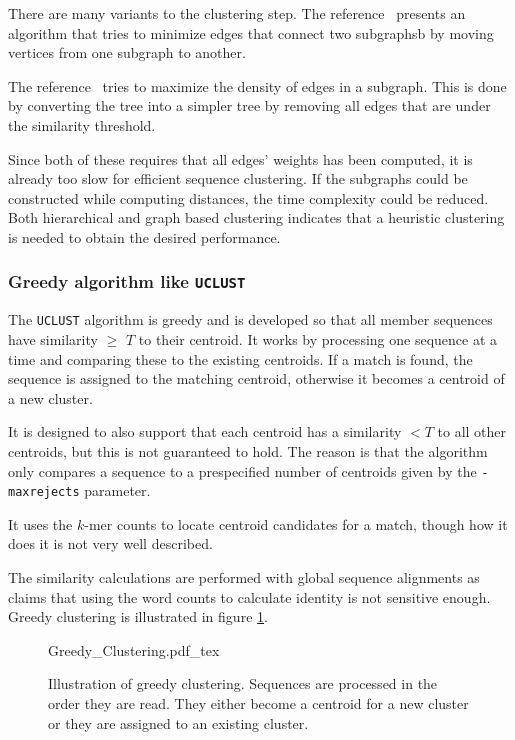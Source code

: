 There are many variants to the clustering step. The reference~\cite{hartuv}
presents an algorithm that tries to minimize edges that connect two subgraphsb by
moving vertices from one subgraph to another.

The reference~\cite{kawaji} tries to maximize the density of edges in a
subgraph. This is done by converting the tree into a simpler tree by removing
all edges that are under the similarity threshold.

Since both of these requires that all edges' weights has been computed, it is
already too slow for efficient sequence clustering. If the subgraphs could be
constructed while computing distances, the time complexity could be reduced.
Both hierarchical and graph based clustering indicates that a heuristic
clustering is needed to obtain the desired performance.

\subsubsection{Greedy algorithm like \texttt{UCLUST}}
The \texttt{UCLUST} algorithm is greedy and is developed so that all member
sequences have similarity $\geq$ $T$ to their centroid.  It works by processing
one sequence at a time and comparing these to the existing centroids. If a
match is found, the sequence is assigned to the matching centroid, otherwise it
becomes a centroid of a new cluster.

It is designed to also support that each centroid has a similarity $<T$ to all
other centroids, but this is not guaranteed to hold. The reason is that the
algorithm only compares a sequence to a prespecified number of centroids given
by the \texttt{-maxrejects} parameter.

It uses the $k$-mer counts to locate centroid candidates for a match, though
how it does it is not very well described.

The similarity calculations are performed with global sequence alignments as
\cite{usearch_algorithm} claims that using the word counts to calculate
identity is not sensitive enough. Greedy clustering is illustrated in figure
\ref{fig:greedy_clustering}.

\begin{figure}[h!]
  \def\svgwidth{\columnwidth}
  {Greedy_Clustering.pdf_tex}
  \caption{Illustration of greedy clustering. Sequences are processed in the order they are read. They either become a centroid for a new cluster or they are assigned to an existing cluster.}
  \label{fig:greedy_clustering}
\end{figure}


